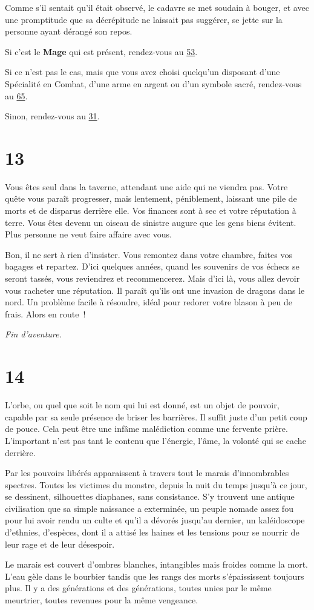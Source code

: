 \documentclass{report}
\newcommand{\gsection}[1]{
    \section{#1}
    \label{section-#1}
}
\newcommand{\glink}[1]{\hyperref[section-#1]{#1}}
\newcommand{\hero}[1]{\textbf{#1}}
\newcommand{\theend}{\emph{Fin d'aventure.}}
\begin{document}
Comme s'il sentait qu'il était observé, le cadavre se met soudain à bouger, et avec une promptitude que sa décrépitude ne laissait pas suggérer, se jette sur la personne ayant dérangé son repos.

Si c'est le \hero{Mage} qui est présent, rendez-vous au \glink{53}.

Si ce n'est pas le cas, mais que vous avez choisi quelqu'un disposant d'une Spécialité en Combat, d'une arme en argent ou d'un symbole sacré, rendez-vous au \glink{65}.

Sinon, rendez-vous au \glink{31}.

\gsection{13}

Vous êtes seul dans la taverne, attendant une aide qui ne viendra pas. Votre quête vous paraît progresser, mais lentement, péniblement, laissant une pile de morts et de disparus derrière elle. Vos finances sont à sec et votre réputation à terre. Vous êtes devenu un oiseau de sinistre augure que les gens biens évitent. Plus personne ne veut faire affaire avec vous.

Bon, il ne sert à rien d'insister. Vous remontez dans votre chambre, faites vos bagages et repartez. D'ici quelques années, quand les souvenirs de vos échecs se seront tassés, vous reviendrez et recommencerez. Mais d'ici là, vous allez devoir vous racheter une réputation. Il paraît qu'ils ont une invasion de dragons dans le nord. Un problème facile à résoudre, idéal pour redorer votre blason à peu de frais. Alors en route !

\theend

\gsection{14}

L'orbe, ou quel que soit le nom qui lui est donné, est un objet de pouvoir, capable par sa seule présence de briser les barrières. Il suffit juste d'un petit coup de pouce. Cela peut être une infâme malédiction comme une fervente prière. L'important n'est pas tant le contenu que l'énergie, l'âme, la volonté qui se cache derrière.

Par les pouvoirs libérés apparaissent à travers tout le marais d'innombrables spectres. Toutes les victimes du monstre, depuis la nuit du temps jusqu'à ce jour, se dessinent, silhouettes diaphanes, sans consistance. S'y trouvent une antique civilisation que sa simple naissance a exterminée, un peuple nomade assez fou pour lui avoir rendu un culte et qu'il a dévorés jusqu'au dernier, un kaléidoscope d'ethnies, d'espèces, dont il a attisé les haines et les tensions pour se nourrir de leur rage et de leur désespoir.

Le marais est couvert d'ombres blanches, intangibles mais froides comme la mort. L'eau gèle dans le bourbier tandis que les rangs des morts s'épaississent toujours plus. Il y a des générations et des générations, toutes unies par le même meurtrier, toutes revenues pour la même vengeance.
\end{document}
